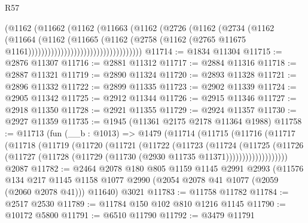 \begin{lexlean}{R57}
\begin{coremodule}
                                          (@1162
                                            (@11662
                                              (@1162
                                                (@11663
                                                  (@1162
                                                    (@2726
                                                      (@1162
                                                        (@2734
                                                          (@1162
                                                            (@11664
                                                              (@1162
                                                                (@11665
                                                                  (@1162
                                                                    (@2758
                                                                      (@1162
                                                                        (@2765
                                                                          @11675
                                                                          @1161)))))))))))))))))))))))))))))))))))
@11714 := @1834 @11304
@11715 := @2876 @11307
@11716 := @2881 @11312
@11717 := @2884 @11316
@11718 := @2887 @11321
@11719 := @2890 @11324
@11720 := @2893 @11328
@11721 := @2896 @11332
@11722 := @2899 @11335
@11723 := @2902 @11339
@11724 := @2905 @11342
@11725 := @2912 @11344
@11726 := @2915 @11346
@11727 := @2918 @11350
@11728 := @2921 @11355
@11729 := @2924 @11357
@11730 := @2927 @11359
@11735 := @1945 (@11361 @2175 @2178 @11364 @1988)
@11758 := @11713
    (fun (__b : @1013) =>
    @1479
      (@11714
        (@11715
          (@11716
            (@11717
              (@11718
                (@11719
                  (@11720
                    (@11721
                      (@11722
                        (@11723
                          (@11724
                            (@11725
                              (@11726
                                (@11727
                                  (@11728 (@11729 (@11730 (@2930 @11735 @11371)))))))))))))))))))
    @2087
@11782 := @2464
    @2078
    @180
    @805
    @1159
    @1145
    @2991
    @2993
    (@11576
      @134
      @217
      @1145
      @1158
      @1077
      @2990
      (@2054 @2078 @41 @1077 (@2059 (@2060 @2078 @41)))
      @11640)
    @3021
@11783 := @11758 @11782
@11784 := @2517 @2530
@11789 := @11784 @150 @102 @810 @1216 @1145
@11790 := @10172 @5800
@11791 := @6510 @11790
@11792 := @3479 @11791

\end{coremodule}
\end{lexlean}
